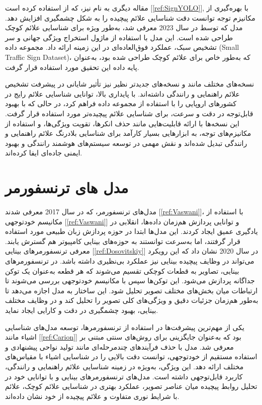 مقاله دیگری به نام  نیز، که از  استفاده کرده است [\ref{ref:SignYOLO}], با بهره‌گیری از مکانیزم توجه توانست دقت شناسایی علائم پیچیده را به شکل چشمگیری افزایش دهد. مدل  که توسط  در سال 2023 معرفی شد، به‌طور ویژه برای شناسایی علائم کوچک طراحی شده است. این مدل با استفاده از ماژول استخراج ویژگی جهانی و سر تشخیص سبک، عملکرد فوق‌العاده‌ای در این زمینه ارائه داد. مجموعه داده  (Small Traffic Sign Dataset)، که به‌طور خاص برای علائم کوچک طراحی شده بود، به‌عنوان پایه داده این تحقیق مورد استفاده قرار گرفت.

نسخه‌های مختلف  مانند  و نسخه‌های جدیدتر نظیر  نیز تأثیر شایانی در پیشرفت تشخیص علائم راهنمایی و رانندگی داشته‌اند.  با پایداری بالا، توانایی شناسایی علائم رایج در کشورهای اروپایی را با استفاده از مجموعه داده  فراهم کرد، در حالی که  با بهبود قابل‌توجه در دقت و سرعت، برای شناسایی علائم پیچیده‌تر مورد استفاده قرار گرفت. این نسخه‌ها با ارائه قابلیت‌هایی مانند حذف انکرها، تقویت ویژگی‌ها، و استفاده از مکانیزم‌های توجه، به ابزارهایی بسیار کارآمد برای شناسایی بلادرنگ علائم راهنمایی و رانندگی تبدیل شده‌اند و نقش مهمی در توسعه سیستم‌های هوشمند رانندگی و بهبود ایمنی جاده‌ای ایفا کرده‌اند.

\section{مدل های ترنسفورمر}
مدل‌های ترنسفورمر، که در سال 2017 معرفی شدند [\ref{ref:Vaswani}]، با استفاده از مکانیسم خودتوجهی [\ref{ref:Vaswani}] و توانایی پردازش هم‌زمان داده‌ها، انقلابی در یادگیری عمیق ایجاد کردند. این مدل‌ها ابتدا در حوزه پردازش زبان طبیعی مورد استفاده قرار گرفتند، اما به‌سرعت توانستند به حوزه‌های بینایی کامپیوتر هم گسترش یابند. معرفی ترنسفورمرهای بینایی [\ref{ref:Dosovitskiy}] در سال 2020 نشان داد که این رویکرد می‌تواند در وظایف پیچیده بینایی نیز عملکرد بی‌نظیری داشته باشد. در ترنسفورمرهای بینایی، تصاویر به قطعات کوچکی تقسیم می‌شوند که هر قطعه به‌عنوان یک توکن جداگانه پردازش می‌شود. این توکن‌ها سپس با مکانیسم خودتوجهی بررسی می‌شوند تا ارتباطات میان بخش‌های مختلف تصویر تحلیل شود. این ساختار به مدل اجازه می‌دهد تا به‌طور هم‌زمان جزئیات دقیق و ویژگی‌های کلی تصویر را تحلیل کند و در وظایف مختلف بینایی، بهبود چشمگیری در دقت و کارایی ایجاد نماید.

یکی از مهم‌ترین پیشرفت‌ها در استفاده از ترنسفورمرها، توسعه مدل‌های شناسایی اشیاء مانند  [\ref{ref:Carion}] بود که به‌عنوان جایگزینی برای روش‌های سنتی مبتنی بر  معرفی شد. مدل  با حذف فرآیندهای چندمرحله‌ای مانند تولید نواحی پیشنهادی و استفاده مستقیم از خودتوجهی، توانست دقت بالایی را در شناسایی اشیاء با مقیاس‌های مختلف ارائه دهد. این ویژگی، به‌ویژه در زمینه شناسایی علائم راهنمایی و رانندگی، کاربرد قابل‌توجهی داشته است. مدل‌های ترنسفورمرهای بینایی و  با توانایی خود در تحلیل روابط پیچیده میان عناصر تصویر، عملکرد بهتری در شناسایی علائم کوچک، علائم با شرایط نوری متفاوت و علائم پیچیده از خود نشان داده‌اند.

